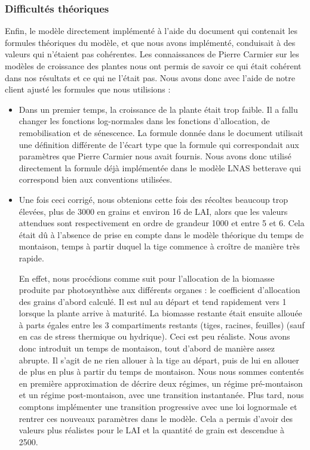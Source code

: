 \subsubsection{Difficultés théoriques}
Enfin, le modèle directement implémenté à l'aide du document qui contenait les formules théoriques du modèle, et que nous avons implémenté, conduisait à des valeurs qui n'étaient pas cohérentes. Les connaissances de Pierre Carmier sur les modèles de croissance des plantes nous ont permis de savoir ce qui était cohérent dans nos résultats et ce qui ne l'était pas. 
Nous avons donc avec l'aide de notre client ajusté les formules que nous utilisions :  
\begin{itemize}
	\item Dans un premier temps, la croissance de la plante était trop faible. Il a fallu changer les fonctions log-normales dans les fonctions d'allocation, de remobilisation et de sénescence. 
La formule donnée dans le document  utilisait une définition différente de l'écart type que la formule qui correspondait aux paramètres que Pierre Carmier nous avait fournis. Nous avons donc utilisé directement la formule déjà implémentée dans le modèle LNAS betterave qui correspond bien aux conventions utilisées.
	\item Une fois ceci corrigé, nous obtenions cette fois des récoltes beaucoup trop élevées, plus de 3000 en grains et environ 16 de LAI, alors que les valeurs attendues sont respectivement en ordre de grandeur 1000 et entre 5 et 6.
Cela était dû à l'absence de prise en compte dans le modèle théorique du temps de montaison, temps à partir duquel la tige commence à croître de manière très rapide.

En effet, nous procédions comme suit pour l'allocation de la biomasse produite par photosynthèse aux différents organes : le coefficient d'allocation des grains d'abord calculé. Il est nul au départ et tend rapidement vers 1 lorsque la plante arrive à maturité. La biomasse restante était ensuite allouée à parts égales entre les 3 compartiments restants (tiges, racines, feuilles) (sauf en cas de stress thermique ou hydrique). Ceci est peu réaliste.
Nous avons donc introduit un temps de montaison, tout d'abord de manière assez abrupte. 
Il s'agit de ne rien allouer à la tige au départ, puis de lui en allouer de plus en plus à partir du temps de montaison. Nous nous sommes contentés en première approximation de décrire deux régimes, un régime pré-montaison et un régime post-montaison, avec une transition instantanée. Plus tard, nous comptons implémenter une transition progressive avec une loi lognormale et rentrer ces nouveaux paramètres dans le modèle.
Cela a permis d'avoir des valeurs plus réalistes pour le LAI et la quantité de grain est descendue à 2500.


\end{itemize}
